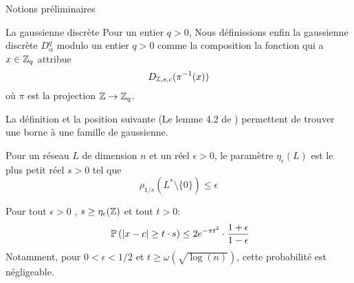 \begin{section}{Notions préliminaires}
\begin{subsection}{La gaussienne discrète}
	Pour un entier $q > 0$,  
	Nous définissions enfin la gaussienne discrète $D^q_{\alpha}$ modulo un entier $q > 0$ comme la
		composition la fonction qui a $x \in \mathbb{Z}_q$ attribue   
		\[ D_{\mathbb{Z}, s, c}(\pi^{-1}(x)) \]
	où $\pi$ est la projection $\mathbb{Z} \rightarrow \mathbb{Z}_q$.

La définition et la position suivante 
(Le lemme 4.2 de \cite{STOC:GenPeiVai08})
permettent de trouver une borne à une famille de gaussienne.
\begin{definition}
Pour un réseau $L$ de dimension $n$ et un réel $\epsilon > 0$, 
	le paramètre $\eta_\epsilon(L)$ est le plus petit réel
	$s>0$ tel que 
	\[\rho_{1/s}(L^* \setminus \{0\}) \leq \epsilon\]
\end{definition}
	\begin{prop}
	Pour tout $\epsilon > 0$ , $s \geq \eta_{\epsilon}(\mathbb{Z})$ et tout
	$t>0$:
	\[ \PP\left(|x-c| \geq t\cdot s\right) \leq 2 e^{-\pi t^2}
	\cdot \frac{1+\epsilon}{1-\epsilon} \]
	Notamment, pour $0 < \epsilon  < 1/2$ et $t \geq \omega(\sqrt{\log(n)})$, cette probabilité est négligeable.
	\end{prop}
	\end{subsection} %
\end{section}
